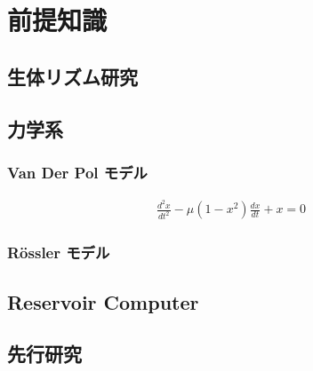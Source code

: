 \chapter{前提知識}

\section{生体リズム研究}
\section{力学系}
\subsection{Van Der Pol モデル}

\begin{align}
    \frac{d^2 x}{d t^2}-\mu\left(1-x^2\right) \frac{d x}{d t}+x=0
\end{align}



\subsection{Rössler モデル}
\clearpage
\section{Reservoir Computer}
\clearpage
\section{先行研究}

\clearpage
